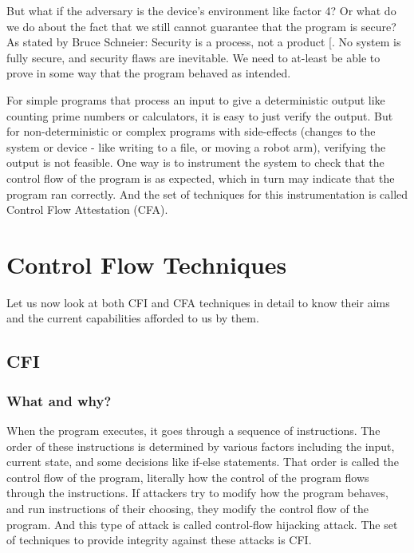 \documentclass[a4paper, nobind]{templates/ociamthesis}
\begin{document}
But what if the adversary is the device's environment like factor 4?
Or what do we do about the fact that we still cannot guarantee that the program is secure?
As stated by Bruce Schneier: Security is a process, not a product {[}\citeproc{ref-bruceessay}{48}{]}.
No system is fully secure, and security flaws are inevitable.
We need to at-least be able to prove in some way that the program behaved as intended.

For simple programs that process an input to give a deterministic output like
counting prime numbers or calculators, it is easy to just verify the output.
But for non-deterministic or complex programs with side-effects (changes to the
system or device - like writing to a file, or moving a robot arm), verifying the
output is not feasible. One way is to instrument the system to check that the
control flow of the program is as expected, which in turn may indicate
that the program ran correctly.
And the set of techniques for this instrumentation is called Control Flow
Attestation (CFA).

\section{Control Flow Techniques}\label{control-flow-techniques}

Let us now look at both CFI and CFA techniques in detail to know their aims and the current
capabilities afforded to us by them.

\subsection{CFI}\label{cfi}

\subsubsection{What and why?}\label{what-and-why}

When the program executes, it goes through a sequence of instructions. The order
of these instructions is determined by various factors including the input, current state,
and some decisions like if-else statements. That order is called the control flow
of the program, literally how the control of the program flows through the instructions.
If attackers try to modify how the program behaves, and run instructions
of their choosing, they modify the control flow of the program. And this type of attack is
called control-flow hijacking attack.
The set of techniques to provide integrity against these attacks is CFI.
\end{document}
